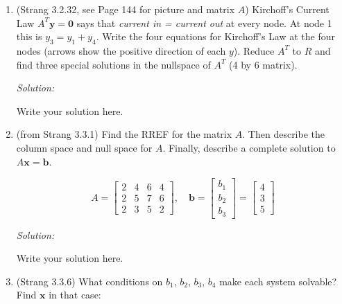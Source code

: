 \documentclass[11pt]{article}
\renewcommand{\vec}[1]{\ensuremath{\mathbf{#1}}}
\newenvironment{sol}
    {\emph{Solution:}
    }
\newcommand{\headings}{
\large{\textbf{YOUR NAME GOES HERE \hfill 21-241 Fall 2019}\\
\textbf{Homework 4 \hfill Due Friday, September 20}}\\
\rule[0.1in]{\textwidth}{0.01in}
}
\begin{document}
\headings

\begin{enumerate}
\section*{Required Problems}
 \item (Strang 3.2.32, see Page 144 for picture and matrix $A$) Kirchoff's Current Law $A^T\vec{y} = \vec{0}$ says that \textit{current in = current out} at every node.  At node 1 this is $y_3 = y_1 + y_4$.  Write the four equations for Kirchoff's Law at the four nodes (arrows show the positive direction of each $y$). Reduce $A^T$ to $R$ and find three special solutions in the nullspace of $A^T$ (4 by 6 matrix).
 
 \begin{sol}
Write your solution here.
\end{sol}
\clearpage

 \item (from Strang 3.3.1)  Find the RREF for the matrix $A$.  Then describe the column space and null space for $A$.  Finally, describe a complete solution to $A \vec{x} = \vec{b}$.
 
 \[ A = \begin{bmatrix}2 & 4 & 6 & 4 \\ 2 & 5 & 7 & 6 \\ 2 & 3 & 5 & 2 \end{bmatrix}, \quad 
 \vec{b} = \begin{bmatrix} b_1 \\ b_2 \\ b_3 \end{bmatrix} = \begin{bmatrix} 4 \\ 3 \\ 5 \end{bmatrix}\]
 
 \begin{sol}
Write your solution here.
\end{sol}
\clearpage
 
 \item (Strang 3.3.6) What conditions on $b_1$, $b_2$, $b_3$, $b_4$ make each system solvable?  Find $\vec{x}$ in that case:


\end{enumerate}
\end{document}
